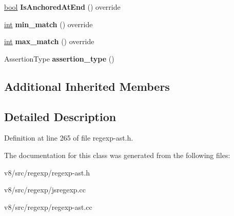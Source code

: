 \begin{DoxyCompactItemize}
\mbox{\hyperlink{classbool}{bool}} {\bfseries Is\+Anchored\+At\+End} () override
\item 
\mbox{\label{classv8_1_1internal_1_1RegExpAssertion_af6541c01d316e53a10095a4a2c88bdec}} 
\mbox{\hyperlink{classint}{int}} {\bfseries min\+\_\+match} () override
\item 
\mbox{\label{classv8_1_1internal_1_1RegExpAssertion_a67392097713d7e6c4b68cc596877e165}} 
\mbox{\hyperlink{classint}{int}} {\bfseries max\+\_\+match} () override
\item 
\mbox{\label{classv8_1_1internal_1_1RegExpAssertion_a2cd52eb460d7c3108f58e6584cf683ad}} 
Assertion\+Type {\bfseries assertion\+\_\+type} ()
\end{DoxyCompactItemize}
\subsection*{Additional Inherited Members}


\subsection{Detailed Description}


Definition at line 265 of file regexp-\/ast.\+h.



The documentation for this class was generated from the following files\+:\begin{DoxyCompactItemize}
\item 
v8/src/regexp/regexp-\/ast.\+h\item 
v8/src/regexp/jsregexp.\+cc\item 
v8/src/regexp/regexp-\/ast.\+cc\end{DoxyCompactItemize}
